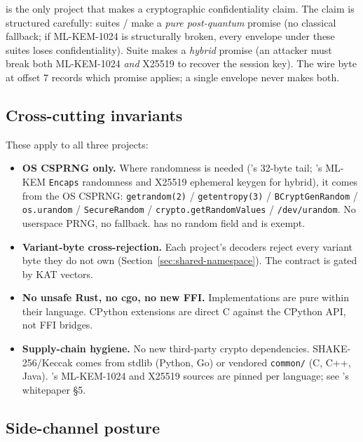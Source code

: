 \tesseraseal{} is the only project that makes a cryptographic confidentiality claim. The claim is structured carefully: suites / make a \emph{pure post-quantum} promise (no classical fallback; if ML-KEM-1024 is structurally broken, every envelope under these suites loses confidentiality). Suite  makes a \emph{hybrid} promise (an attacker must break both ML-KEM-1024 \emph{and} X25519 to recover the session key). The wire byte at offset 7 records which promise applies; a single envelope never makes both.

\subsection{Cross-cutting invariants}

These apply to all three projects:

\begin{itemize}
\item \textbf{OS CSPRNG only.} Where randomness is needed (\tesseraid{}'s 32-byte tail; \tesseraseal{}'s ML-KEM \texttt{Encaps} randomness and X25519 ephemeral keygen for hybrid), it comes from the OS CSPRNG: \texttt{getrandom(2)} / \texttt{getentropy(3)} / \texttt{BCryptGenRandom} / \texttt{os.urandom} / \texttt{SecureRandom} / \texttt{crypto.getRandomValues} / \texttt{/dev/urandom}. No userspace PRNG, no fallback. \tesserahash{} has no random field and is exempt.
\item \textbf{Variant-byte cross-rejection.} Each project's decoders reject every variant byte they do not own (Section~\ref{sec:shared-namespace}). The contract is gated by KAT vectors.
\item \textbf{No unsafe Rust, no cgo, no new FFI.} Implementations are pure within their language. CPython extensions are direct C against the CPython API, not FFI bridges.
\item \textbf{Supply-chain hygiene.} No new third-party crypto dependencies. SHAKE-256/Keccak comes from stdlib (Python, Go) or vendored \texttt{common/} (C, C++, Java). \tesseraseal{}'s ML-KEM-1024 and X25519 sources are pinned per language; see \tesseraseal{}'s whitepaper §5.
\end{itemize}

\subsection{Side-channel posture}


